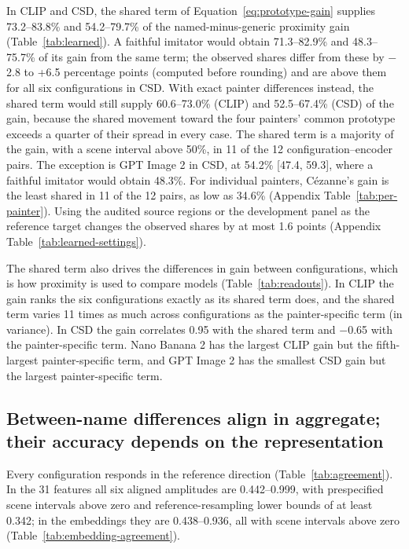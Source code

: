 \documentclass[10pt]{article}
\begin{document}



In CLIP and CSD, the shared term of Equation~\ref{eq:prototype-gain} supplies 73.2--83.8\% and
54.2--79.7\% of the named-minus-generic proximity gain (Table~\ref{tab:learned}). A faithful
imitator would obtain 71.3--82.9\% and 48.3--75.7\% of its gain from the same term; the observed
shares differ from these by $-$2.8 to +6.5 percentage points (computed before rounding) and are
above them for all six configurations in CSD. With exact painter differences instead, the shared
term would still supply 60.6--73.0\% (CLIP) and 52.5--67.4\% (CSD) of the gain, because the shared
movement toward the four painters' common prototype exceeds a quarter of their spread in every case.
The shared term is a majority of the gain, with a scene interval above 50\%, in 11 of the 12
configuration--encoder pairs. The exception is GPT Image 2 in CSD, at 54.2\% [47.4, 59.3], where a
faithful imitator would obtain 48.3\%. For individual painters, C\'ezanne's gain is the least shared
in 11 of the 12 pairs, as low as 34.6\% (Appendix Table~\ref{tab:per-painter}). Using the audited
source regions or the development panel as the reference target changes the observed shares by at
most 1.6 points (Appendix Table~\ref{tab:learned-settings}).

The shared term also drives the differences in gain between configurations, which is how proximity
is used to compare models (Table~\ref{tab:readouts}). In CLIP the gain ranks the six configurations
exactly as its shared term does, and the shared term varies 11 times as much across configurations
as the painter-specific term (in variance). In CSD the gain correlates 0.95 with the shared term and
$-$0.65 with the painter-specific term. Nano Banana 2 has the largest CLIP gain but the fifth-largest
painter-specific term, and GPT Image 2 has the smallest CSD gain but the largest painter-specific
term.

\subsection{Between-name differences align in aggregate; their accuracy depends on the representation}\label{sec:agreement}



Every configuration responds in the reference direction (Table~\ref{tab:agreement}). In the 31
features all six aligned amplitudes are 0.442--0.999, with prespecified scene intervals above zero
and reference-resampling lower bounds of at least 0.342; in the embeddings they are 0.438--0.936,
all with scene intervals above zero (Table~\ref{tab:embedding-agreement}).
\end{document}
